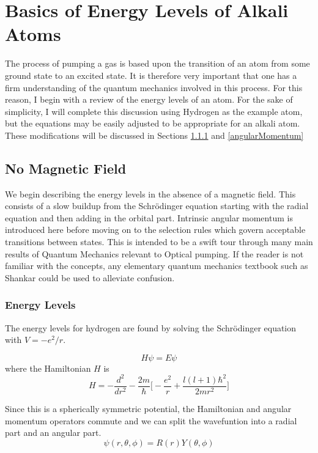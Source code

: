 \documentclass[letter,12pt]{article}
\newcommand{\schr}{Schr\"odinger}
\begin{document}
\section{Basics of Energy Levels of Alkali Atoms}
The process of pumping a gas is based upon the transition
of an atom from some ground state to an excited state. 
It is therefore very important that one has a firm 
understanding of the quantum mechanics involved in this 
process. For this reason, I begin with a review of the energy
levels of an atom. For the sake of simplicity, I will complete
this discussion using
Hydrogen as the example atom, but the equations may be 
easily adjusted to be appropriate for an alkali atom.
These modifications will be discussed in Sections \ref{energyLevels}
and \ref{angularMomentum}
	\subsection{No Magnetic Field}
    We begin describing the energy levels in the absence of 
    a magnetic field. This consists of a slow buildup 
    from the Schr\"odinger equation starting with the radial
    equation and then adding in the orbital part. Intrinsic 
    angular momentum is introduced here before moving on to
    the selection rules which govern acceptable transitions
    between states. This is intended to be a swift tour through
	many main results of Quantum Mechanics relevant to 
	Optical pumping. If the reader is not familiar with the 
	concepts, any elementary quantum mechanics textbook
	such as Shankar could be used to alleviate confusion.
		\subsubsection{Energy Levels}\label{energyLevels}
		The energy levels for hydrogen are found by solving the
		{\schr} equation with $V=-e^2/r$. 

		\begin{equation}
		  H\psi = E\psi
		\end{equation}
		where the Hamiltonian $H$ is 
		\begin{equation}
			H=-\frac{d^2}{dr^2}-\frac{2m}{\hbar}\Big[-\frac{e^2}{r} + \frac{l(l+1)\hbar^2}{2mr^2}\Big]
		\end{equation}
		
		Since this is a spherically
		symmetric potential, the Hamiltonian and angular momentum
		operators commute and we can split the wavefuntion into a
		radial part and an angular part. 
		\begin{equation}
			\psi(r,\theta,\phi)=R(r)Y(\theta,\phi)
		\end{equation}
\end{document}
